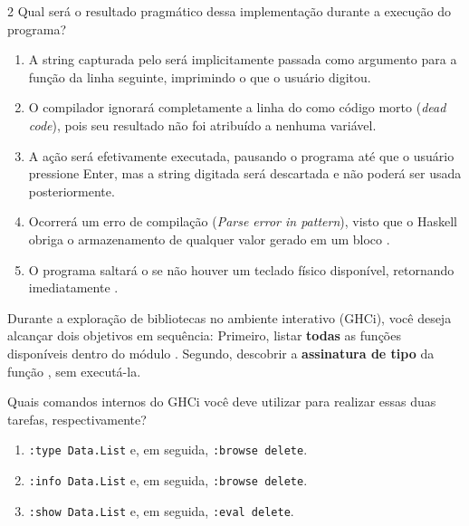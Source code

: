 \documentclass[a4paper,10pt,brazil]{article}
\begin{document}
\begin{multicols}{2}
Qual será o resultado pragmático dessa implementação durante a execução do programa?

\begin{enumerate}
  \item A string capturada pelo  será implicitamente passada como argumento para a função  da linha seguinte, imprimindo o que o usuário digitou.

  \item O compilador ignorará completamente a linha do  como código morto (\emph{dead code}), pois seu resultado não foi atribuído a nenhuma variável.

  \item A ação  será efetivamente executada, pausando o programa até que o usuário pressione Enter, mas a string digitada será descartada e não poderá ser usada posteriormente.

  \item Ocorrerá um erro de compilação (\emph{Parse error in pattern}), visto que o Haskell obriga o armazenamento de qualquer valor gerado em um bloco .

  \item O programa saltará o  se não houver um teclado físico disponível, retornando imediatamente .


\end{enumerate}

Durante a exploração de bibliotecas no ambiente interativo (GHCi), você deseja alcançar dois objetivos em sequência:
Primeiro, listar \textbf{todas} as funções disponíveis dentro do módulo .
Segundo, descobrir a \textbf{assinatura de tipo} da função , sem executá-la.

Quais comandos internos do GHCi você deve utilizar para realizar essas duas tarefas, respectivamente?

\begin{enumerate}
  \item \texttt{:type Data.List} e, em seguida, \texttt{:browse delete}.

  \item \texttt{:info Data.List} e, em seguida, \texttt{:browse delete}.

  \item \texttt{:show Data.List} e, em seguida, \texttt{:eval delete}.


\end{enumerate}
\end{multicols}
\end{document}
